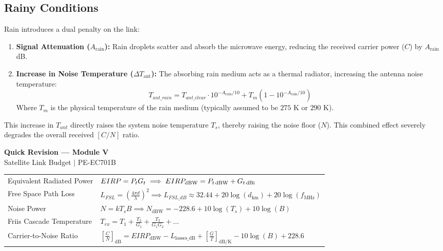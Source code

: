 \documentclass[12pt,a4paper]{article}
\renewcommand{\arraystretch}{1.45}
\begin{document}
\subsection{Rainy Conditions}
Rain introduces a dual penalty on the link:
\begin{enumerate}[label=\textbf{\arabic*.}, leftmargin=*, itemsep=3pt]
  \item \textbf{Signal Attenuation ($A_{\text{rain}}$):} Rain droplets scatter and absorb the microwave energy, reducing the received carrier power ($C$) by $A_{\text{rain}}$ dB.
  \item \textbf{Increase in Noise Temperature ($\Delta T_{\text{ant}}$):} The absorbing rain medium acts as a thermal radiator, increasing the antenna noise temperature:
    \begin{equation}
      T_{ant\_rain} = T_{ant\_clear} \cdot 10^{-A_{\text{rain}}/10} + T_m \left( 1 - 10^{-A_{\text{rain}}/10} \right)
    \end{equation}
    Where $T_m$ is the physical temperature of the rain medium (typically assumed to be $275\text{ K}$ or $290\text{ K}$).
\end{enumerate}

This increase in $T_{ant}$ directly raises the system noise temperature $T_s$, thereby raising the noise floor ($N$). This combined effect severely degrades the overall received $[C/N]$ ratio.

\newpage
\begin{center}
  {\large\bfseries\color{myred} Quick Revision --- Module V}\\[3pt]
  {\small\color{mydark} Satellite Link Budget $|$ PE-EC701B}
\end{center}
\noindent{\color{myred}\rule{\linewidth}{1.2pt}}
\vspace{4pt}

\begin{tcolorbox}[formulabox, title={\textbf{Key Formulas at a Glance}}]
\renewcommand{\arraystretch}{1.9}
\begin{tabularx}{\linewidth}{B{5.0cm} X}Equivalent Radiated Power & $EIRP = P_t G_t \implies EIRP_{\text{dBW}} = P_{t\text{\,dBW}} + G_{t\text{\,dBi}}$ \\[4pt]
Free Space Path Loss & $\displaystyle L_{FSL} = \left(\frac{4\pi d}{\lambda}\right)^2 \implies L_{FSL\_dB} \approx 32.44 + 20\log(d_{\text{km}}) + 20\log(f_{\text{MHz}})$ \\[4pt]
Noise Power & $N = k T_s B \implies N_{\text{dBW}} = -228.6 + 10\log(T_s) + 10\log(B)$ \\[4pt]
Friis Cascade Temperature & $\displaystyle T_{rx} = T_1 + \frac{T_2}{G_1} + \frac{T_3}{G_1 G_2} + \dots$ \\[4pt]
Carrier-to-Noise Ratio & $\displaystyle \left[\frac{C}{N}\right]_{\text{dB}} = EIRP_{\text{dBW}} - L_{\text{losses\_dB}} + \left[\frac{G}{T}\right]_{\text{dB/K}} - 10\log(B) + 228.6$
\end{tabularx}
\end{tcolorbox}
\end{document}

